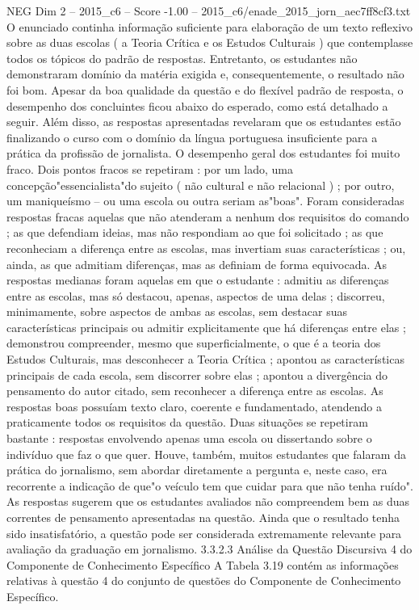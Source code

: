 \begin{textsample}{NEG Dim 2 – 2015\_c6 – Score -1.00 – 2015\_c6/enade\_2015\_jorn\_aec7ff8cf3.txt}
O enunciado continha informação suficiente para elaboração de um texto reflexivo sobre as duas escolas ( a Teoria Crítica e os Estudos Culturais ) que contemplasse todos os tópicos do padrão de respostas.
Entretanto, os estudantes não demonstraram domínio da matéria exigida e, consequentemente, o resultado não foi bom.
Apesar da boa qualidade da questão e do flexível padrão de resposta, o desempenho dos concluintes ficou abaixo do esperado, como está detalhado a seguir.
Além disso, as respostas apresentadas revelaram que os estudantes estão finalizando o curso com o domínio da língua portuguesa insuficiente para a prática da profissão de jornalista.
O desempenho geral dos estudantes foi muito fraco.
Dois pontos fracos se repetiram : por um lado, uma concepção"essencialista"do sujeito ( não cultural e não relacional ) ; por outro, um maniqueísmo – ou uma escola ou outra seriam as"boas".
Foram consideradas respostas fracas aquelas que não atenderam a nenhum dos requisitos do comando ; as que defendiam ideias, mas não respondiam ao que foi solicitado ; as que reconheciam a diferença entre as escolas, mas invertiam suas características ; ou, ainda, as que admitiam diferenças, mas as definiam de forma equivocada.
As respostas medianas foram aquelas em que o estudante : admitiu as diferenças entre as escolas, mas só destacou, apenas, aspectos de uma delas ; discorreu, minimamente, sobre aspectos de ambas as escolas, sem destacar suas características principais ou admitir explicitamente que há diferenças entre elas ; demonstrou compreender, mesmo que superficialmente, o que é a teoria dos Estudos Culturais, mas desconhecer a Teoria Crítica ; apontou as características principais de cada escola, sem discorrer sobre elas ; apontou a divergência do pensamento do autor citado, sem reconhecer a diferença entre as escolas.
As respostas boas possuíam texto claro, coerente e fundamentado, atendendo a praticamente todos os requisitos da questão.
Duas situações se repetiram bastante : respostas envolvendo apenas uma escola ou dissertando sobre o indivíduo que faz o que quer.
Houve, também, muitos estudantes que falaram da prática do jornalismo, sem abordar diretamente a pergunta e, neste caso, era recorrente a indicação de que"o veículo tem que cuidar para que não tenha ruído".
As respostas sugerem que os estudantes avaliados não compreendem bem as duas correntes de pensamento apresentadas na questão.
Ainda que o resultado tenha sido insatisfatório, a questão pode ser considerada extremamente relevante para avaliação da graduação em jornalismo. 3.3.2.3 Análise da Questão Discursiva 4 do Componente de Conhecimento Específico A Tabela 3.19 contém as informações relativas à questão 4 do conjunto de questões do Componente de Conhecimento Específico.

\end{textsample}
